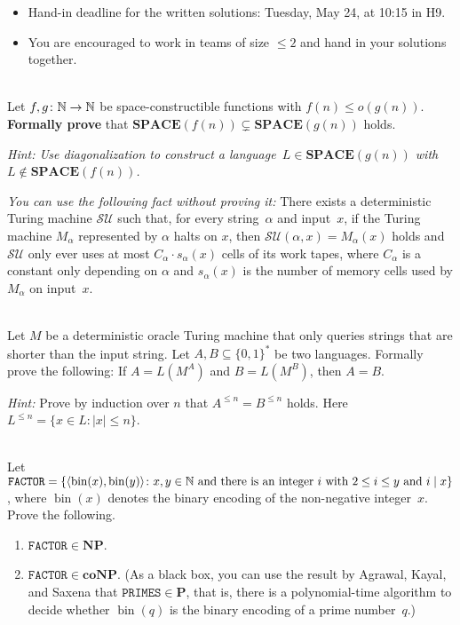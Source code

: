 \documentclass[english]{uebung_cs}
\begin{document}
\begin{itemize}
  \item Hand-in deadline for the written solutions: Tuesday, May 24, at 10:15 in H9.
  \item You are encouraged to work in teams of size $\le 2$ and hand in your solutions together.
\end{itemize}

\begin{aufgabe}[Diagonalization]\mbox{}\\
    Let $f,g\colon\mathbb{N}\to\mathbb{N}$ be space-constructible functions with $f(n)\le o(g(n))$.
    \textbf{Formally prove} that $\mathbf{SPACE}(f(n))\subsetneq\mathbf{SPACE}(g(n))$ holds.

    \textit{Hint: Use diagonalization to construct a language~$L\in\mathbf{SPACE}(g(n))$ with $L\not\in\mathbf{SPACE}(f(n))$.}

    \textit{You can use the following fact without proving it:}
    There exists a deterministic Turing machine $\mathcal{SU}$ such that, for every string~$\alpha$ and input~$x$, if the Turing machine $M_\alpha$ represented by $\alpha$ halts on $x$, then
      $\mathcal{SU}(\alpha,x)=M_\alpha(x)$ holds and
      $\mathcal{SU}$ only ever uses at most $C_\alpha\cdot s_\alpha(x)$ cells of its work tapes, where $C_\alpha$ is a constant only depending on $\alpha$ and $s_\alpha(x)$ is the number of memory cells used by $M_\alpha$ on input~$x$.
\end{aufgabe}

\begin{aufgabe}[Oracles]\mbox{}\\
  Let $M$ be a deterministic oracle Turing machine that only queries strings 
  that are shorter than the input string.
  Let $A,B\subseteq\{0,1\}^\ast$ be two languages.
  Formally prove the following: If $A = L(M^A)$ and $B = L(M^B)$, then $A = B$.
  
  \emph{Hint:} Prove by induction over $n$ that $A^{\le n} = B^{\le n}$ holds. Here $L^{\le n}=\{x\in L\colon |x|\le n\}$.
\end{aufgabe}

\begin{aufgabe}\mbox{}\\
  Let $\mathtt{FACTOR}=\{\langle\operatorname{bin}(x),\operatorname{bin}(y)\rangle\colon \text{$x,y\in\mathbb{N}$ and there is an integer $i$ with $2\le i \le y$ and $i \mathrel{|} x$}\}$,
  where $\operatorname{bin}(x)$ denotes the binary encoding of the non-negative integer~$x$.
  Prove the following.
  \begin{enumerate}
    \item $\mathtt{FACTOR}\in\mathbf{NP}$.
    \item $\mathtt{FACTOR}\in\mathbf{coNP}$. (As a black box, you can use the result by Agrawal, Kayal, and Saxena that $\mathtt{PRIMES}\in\mathbf{P}$, that is, there is a polynomial-time algorithm to decide whether $\operatorname{bin}(q)$ is the binary encoding of a prime number~$q$.)
  \end{enumerate}
\end{aufgabe}
\end{document}

